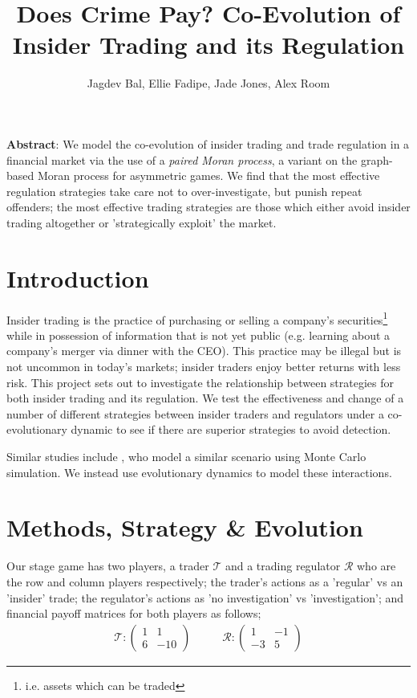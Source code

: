 \documentclass{article}
\title{Does Crime Pay? Co-Evolution of Insider Trading and its Regulation}
\author{Jagdev Bal, Ellie Fadipe, Jade Jones, Alex Room}
\date{}
\begin{document}
\maketitle
\textbf{Abstract}:
We model the co-evolution of insider trading and trade regulation in a financial market via the use of a \emph{paired Moran process}, a variant on the graph-based Moran process for asymmetric games. We find that the most effective regulation strategies take care not to over-investigate, but punish repeat offenders; the most effective trading strategies are those which either avoid insider trading altogether or 'strategically exploit' the market.

\section{Introduction}
Insider trading is the practice of purchasing or selling a company’s securities\footnote{i.e. assets which can be traded} while in possession of information that is not yet public (e.g. learning about a company's merger via dinner with the CEO). This practice may be illegal but is not uncommon in today's markets; insider traders enjoy better returns with less risk. \parencite{bainbridge1998insider} This project sets out to investigate the relationship between strategies for both insider trading and its regulation. We test the effectiveness and change of a number of different strategies between insider traders and regulators under a co-evolutionary dynamic to see if there are superior strategies to avoid detection. 

Similar studies include \textcite{smales2017game}, who model a similar scenario using Monte Carlo simulation. We instead use evolutionary dynamics to model these interactions.

\section{Methods, Strategy \& Evolution}
Our stage game has two players, a trader $\mathcal{T}$ and a trading regulator $\mathcal{R}$ who are the row and column players respectively; the trader's actions as a 'regular' vs an 'insider' trade; the regulator's actions as 'no investigation' vs 'investigation'; and financial payoff matrices for both players as follows;
\begin{equation*}
\begin{split}
    \mathcal{T}: 
    \begin{pmatrix}
    1 & 1 \\
    6 & -10
    \end{pmatrix}
\end{split}
\quad\quad
\begin{split}
    \mathcal{R}: 
    \begin{pmatrix}
    1 & -1 \\
    -3 & 5
    \end{pmatrix}
\end{split}
\end{equation*}
\end{document}
